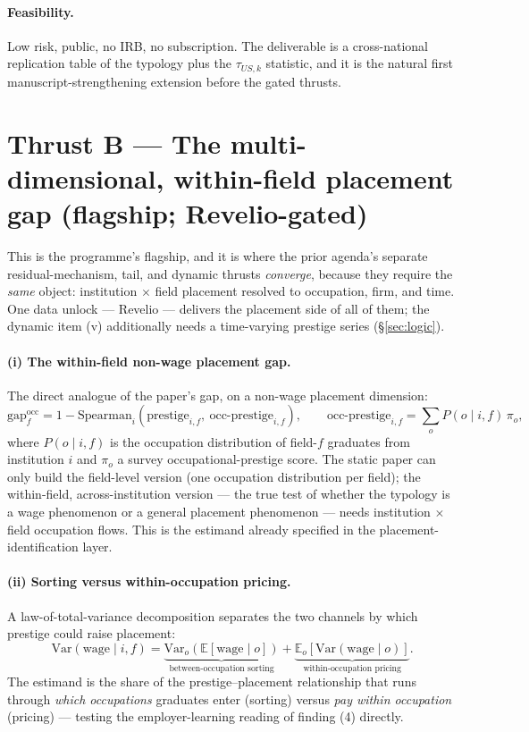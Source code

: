 \documentclass[11pt]{article}
\begin{document}
\paragraph{Feasibility.} Low risk, public, no IRB, no subscription. The deliverable is a cross-national replication
table of the typology plus the $\tau_{US,k}$ statistic, and it is the natural first manuscript-strengthening
extension before the gated thrusts.

\section{Thrust B --- The multi-dimensional, within-field placement gap (flagship; Revelio-gated)}\label{sec:thrustB}
This is the programme's flagship, and it is where the prior agenda's separate residual-mechanism, tail, and dynamic
thrusts \emph{converge}, because they require the \emph{same} object: institution $\times$ field placement resolved
to occupation, firm, and time. One data unlock --- Revelio --- delivers the placement side of all of them; the
dynamic item (v) additionally needs a time-varying prestige series (\S\ref{sec:logic}).

\paragraph{(i) The within-field non-wage placement gap.} The direct analogue of the paper's gap, on a non-wage
placement dimension:
\[
\mathrm{gap}^{\mathrm{occ}}_f = 1 - \mathrm{Spearman}_i\!\left(\text{prestige}_{i,f},\ \text{occ-prestige}_{i,f}\right),
\qquad
\text{occ-prestige}_{i,f} = \sum_o P(o\mid i,f)\,\pi_o,
\]
where $P(o\mid i,f)$ is the occupation distribution of field-$f$ graduates from institution $i$ and $\pi_o$ a
survey occupational-prestige score. The static paper can only build the field-level version (one occupation
distribution per field); the within-field, across-institution version --- the true test of whether the typology is
a wage phenomenon or a general placement phenomenon --- needs institution $\times$ field occupation flows. This is
the estimand already specified in the placement-identification layer.

\paragraph{(ii) Sorting versus within-occupation pricing.} A law-of-total-variance decomposition separates the two
channels by which prestige could raise placement:
\[
\mathrm{Var}\!\left(\text{wage}\mid i,f\right)
= \underbrace{\mathrm{Var}_o\!\left(\mathbb{E}[\text{wage}\mid o]\right)}_{\text{between-occupation sorting}}
+ \underbrace{\mathbb{E}_o\!\left[\mathrm{Var}(\text{wage}\mid o)\right]}_{\text{within-occupation pricing}} .
\]
The estimand is the share of the prestige--placement relationship that runs through \emph{which occupations}
graduates enter (sorting) versus \emph{pay within occupation} (pricing) --- testing the employer-learning reading
of finding (4) directly.
\end{document}
